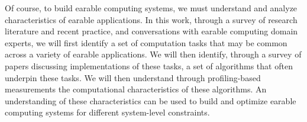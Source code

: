 
Of course, to build earable computing systems, we must understand and analyze
characteristics of earable applications.  In this work, through a survey of
research literature and recent practice, and conversations with earable computing domain experts,
we will first identify a set of computation tasks that may be common across
a variety of earable applications.  We will then identify, through
a survey of papers discussing implementations of these tasks, a set of
algorithms that often underpin these tasks.  We will then understand through
profiling-based measurements the computational characteristics of these
algorithms.  An understanding of these
characteristics can be used to build and optimize earable computing systems for different
system-level constraints.


